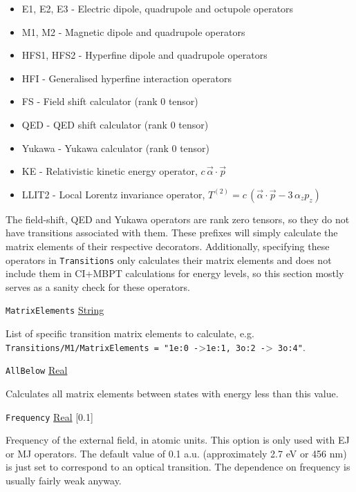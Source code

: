 \documentclass{report}
\begin{document}
\begin{itemize}
\item E1, E2, E3 - Electric dipole, quadrupole and octupole operators
\item M1, M2 - Magnetic dipole and quadrupole operators
\item HFS1, HFS2 - Hyperfine dipole and quadrupole operators
\item HFI - Generalised hyperfine interaction operators
\item FS - Field shift calculator (rank 0 tensor)
\item QED - QED shift calculator (rank 0 tensor)
\item Yukawa - Yukawa calculator (rank 0 tensor)
\item KE - Relativistic kinetic energy operator, $c\,\vec{\alpha}\cdot\vec{p}$
\item LLIT2 - Local Lorentz invariance operator, $T^{(2)} = c\,(\vec{\alpha}\cdot\vec{p} - 3\,\alpha_z p_z)$
\end{itemize}

The field-shift, QED and Yukawa operators are rank zero tensors, so they do not have transitions
associated with them. These prefixes will simply calculate the matrix elements of their respective
decorators. Additionally, specifying these operators in \texttt{Transitions} only calculates their
matrix elements and does not include them in CI+MBPT calculations for energy levels, so this
section mostly serves as a sanity check for these operators.

\texttt{MatrixElements} \uline{String}
\begin{adjustwidth}{1cm}{}
List of specific transition matrix elements to calculate, e.g.
\texttt{Transitions/M1/MatrixElements = "1e:0 -}\textgreater \texttt{1e:1, 3o:2 -}\textgreater\texttt{ 3o:4"}.
\end{adjustwidth}

\texttt{AllBelow} \uline{Real}
\begin{adjustwidth}{1cm}{}
Calculates all matrix elements between states with energy less than this value.
\end{adjustwidth}

\texttt{Frequency} \uline{Real} [0.1]
\begin{adjustwidth}{1cm}{}
Frequency of the external field, in atomic units. This option is only used with EJ or MJ operators. The default value of 0.1 a.u. (approximately 2.7 eV or 456 nm) is just set to correspond to an optical transition. The dependence on frequency is usually fairly weak anyway.
\end{adjustwidth}
\end{document}
